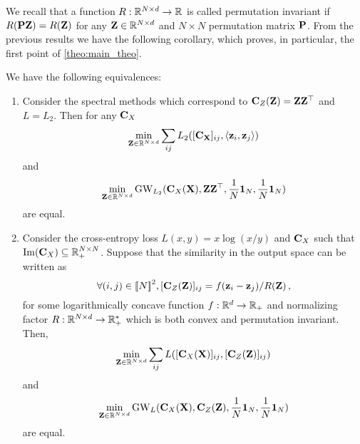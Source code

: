 We recall that a function $R: \mathbb{R}^{N \times d} \to \mathbb{R}$ is called permutation invariant if $R({\mathbf{P}} {\mathbf{Z}}) = R({\mathbf{Z}})$ for any ${\mathbf{Z}} \in \mathbb{R}^{N \times d}$ and $N \times N$ permutation matrix ${\mathbf{P}}$. From the previous results we have the following corollary, which proves, in particular, the first point of \cref{theo:main_theo}.
\begin{corollary}
	\label{corr:equivCE}
	We have the following equivalences:
	\begin{enumerate}[label=(\roman*), rightmargin=25pt]
		\item Consider the spectral methods which correspond to ${\mathbf{C}}_{Z}({\mathbf{Z}}) = {\mathbf{Z}} {\mathbf{Z}}^\top$ and $L =L_2$. Then for any ${\mathbf{C}}_{X}$
		\begin{equation}
			\min_{{\mathbf{Z}} \in \mathbb{R}^{N \times d}} \sum_{ij} L_2([{\mathbf{C}}_{\mathbf{X}}]_{ij}, \langle {\mathbf{z}}_i, {\mathbf{z}}_j\rangle)
		\end{equation}
		and 
		\begin{equation}
			\min_{{\mathbf{Z}} \in \mathbb{R}^{N \times d}} \operatorname{GW}_{L_2}({\mathbf{C}}_{X}({\mathbf{X}}), {\mathbf{Z}} {\mathbf{Z}}^\top, \frac{1}{N}\mathbf{1}_N, \frac{1}{N}\mathbf{1}_N)
		\end{equation}
		are equal.
		\item Consider the cross-entropy loss $L(x,y) = x \log(x/y)$ and ${\mathbf{C}}_{X}$ such that $\operatorname{Im}({\mathbf{C}}_{X})\subseteq \mathbb{R}_{+}^{N \times N}$. Suppose that the similarity in the output space can be written as 
		\begin{equation}
			\forall (i,j)\in {[\![N]\!]}^2, [{\mathbf{C}}_{Z}({\mathbf{Z}})]_{ij} =  f({\mathbf{z}}_i -{\mathbf{z}}_j)/ R({\mathbf{Z}})\,,
		\end{equation}
		for some logarithmically concave function $f: \mathbb{R}^d \to \mathbb{R}_{+}$ and normalizing factor $R: \mathbb{R}^{N \times d} \to \mathbb{R}_{+}^{*}$ which is both convex and permutation invariant. Then,
		\begin{equation}
			\label{eq:neighbor_embedding_problem}
			\min_{{\mathbf{Z}} \in \mathbb{R}^{N \times d}} \sum_{ij} L([{\mathbf{C}}_{X}({\mathbf{X}})]_{ij}, [{\mathbf{C}}_{Z}({\mathbf{Z}})]_{ij})
		\end{equation}
		and 
		\begin{equation}
			\min_{{\mathbf{Z}} \in \mathbb{R}^{N \times d}} \operatorname{GW}_{L}({\mathbf{C}}_{X}({\mathbf{X}}), {\mathbf{C}}_{Z}({\mathbf{Z}}), \frac{1}{N}\mathbf{1}_N, \frac{1}{N}\mathbf{1}_N)
		\end{equation}
		are equal. 
	\end{enumerate}
\end{corollary}
